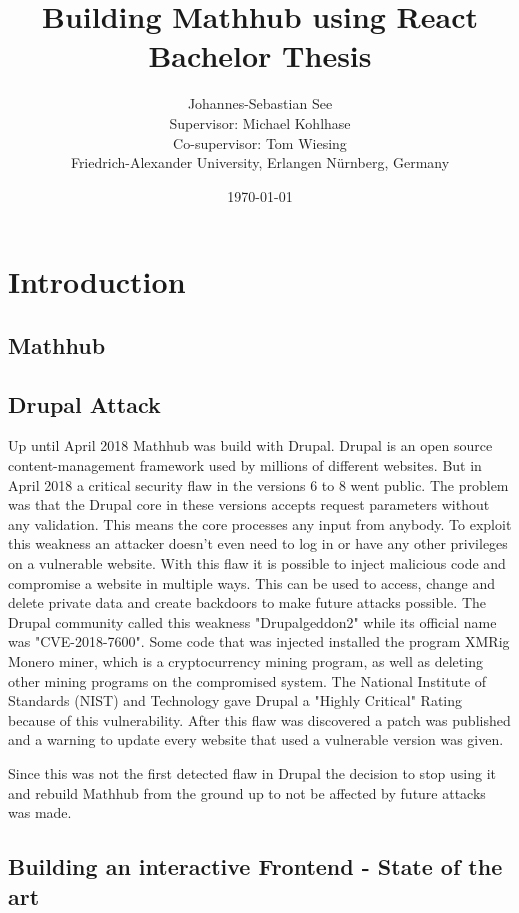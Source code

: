 \documentclass[11pt,a4paper]{article}
\title{Building Mathhub using React\\ \vspace{2 mm} Bachelor Thesis}
\author{Johannes-Sebastian See\\Supervisor: Michael Kohlhase\\Co-supervisor: Tom Wiesing\\Friedrich-Alexander University, Erlangen Nürnberg, Germany}
\date{\today}
\begin{document}
\begin{titlepage}
\maketitle
\end{titlepage}

\tableofcontents
\section{Introduction}
	\subsection{Mathhub}
	\subsection{Drupal Attack}
	Up until April 2018 Mathhub was build with Drupal. Drupal is an open source content-management framework used by millions of different websites.
	But in April 2018 a critical security flaw in the versions 6 to 8 went public. The problem was that the Drupal core in these versions accepts request parameters without any validation. This means the core processes any input from anybody. To exploit this weakness an attacker doesn't even need to log in or have any other privileges on a vulnerable website. With this flaw it is possible to inject malicious code and compromise a website in multiple ways. This can be used to access, change and delete private data and create backdoors to make future attacks possible. The Drupal community called this weakness "Drupalgeddon2" while its official name was "CVE-2018-7600". Some code that was injected installed the program XMRig Monero miner, which is a cryptocurrency mining program, as well as deleting other mining programs on the compromised system. The National Institute of Standards (NIST) and Technology gave Drupal a "Highly Critical" Rating because of this vulnerability. After this flaw was discovered a patch was published and a warning to update every website that used a vulnerable version was given.
	
Since this was not the first detected flaw in Drupal the decision to stop using it and rebuild Mathhub from the ground up to not be affected by future attacks was made.

	\subsection{Building an interactive Frontend - State of the art}
\end{document}
